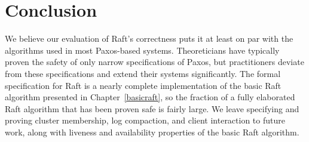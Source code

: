 \section{Conclusion}

We believe our evaluation of Raft's correctness puts it at least on par
with the algorithms used in most Paxos-based systems. Theoreticians have
typically proven the safety of only narrow specifications of Paxos, but
practitioners deviate from these specifications and extend their systems
significantly. The formal specification for Raft is a nearly complete
implementation of the basic Raft algorithm presented in
Chapter~\ref{basicraft}, so the fraction of a fully elaborated Raft
algorithm that has been proven safe is fairly large. We leave specifying
and proving cluster membership, log compaction, and client interaction
to future work, along
with liveness and availability properties of the basic Raft algorithm.
